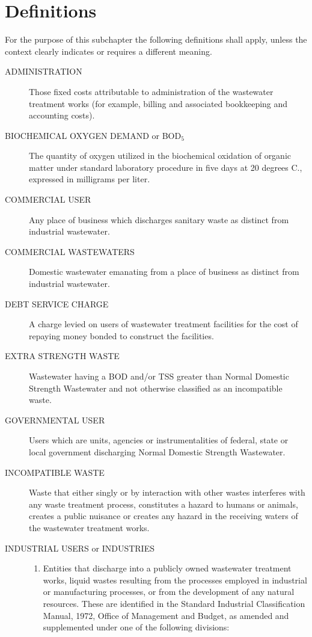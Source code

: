 \documentclass[code.tex]{subfiles}
\begin{document}
\section{Definitions}
For the purpose of this subchapter the following definitions shall apply, unless the context clearly indicates or requires a different meaning.
\begin{description}
\item[ADMINISTRATION] Those fixed costs attributable to administration of the wastewater treatment works (for example, billing and associated bookkeeping and accounting costs).
\item[BIOCHEMICAL OXYGEN DEMAND or BOD$_{5}$] The quantity of oxygen utilized in the biochemical oxidation of organic matter under standard laboratory procedure in five days at 20 degrees C., expressed in milligrams per liter.
\item[COMMERCIAL USER] Any place of business which discharges sanitary waste as distinct from industrial wastewater.
\item[COMMERCIAL WASTEWATERS] Domestic wastewater emanating from a place of business as distinct from industrial wastewater.
\item[DEBT SERVICE CHARGE] A charge levied on users of wastewater treatment facilities for the cost of repaying money bonded to construct the facilities.
\item[EXTRA STRENGTH WASTE] Wastewater having a BOD and/or TSS greater than Normal Domestic Strength Wastewater and not otherwise classified as an incompatible waste.
\item[GOVERNMENTAL USER] Users which are units, agencies or instrumentalities of federal, state or local government discharging Normal Domestic Strength Wastewater.
\item[INCOMPATIBLE WASTE] Waste that either singly or by interaction with other wastes interferes with any waste treatment process, constitutes a hazard to humans or animals, creates a public nuisance or creates any hazard in the receiving waters of the wastewater treatment works.
\item[INDUSTRIAL USERS or INDUSTRIES]
\begin{enumerate}
\item Entities that discharge into a publicly owned wastewater treatment works, liquid wastes resulting from the processes employed in industrial or manufacturing processes, or from the development of any natural resources.  These are identified in the Standard Industrial Classification Manual, 1972, Office of Management and Budget, as amended and supplemented under one of the following divisions:

\end{enumerate}
\end{description}
\end{document}
